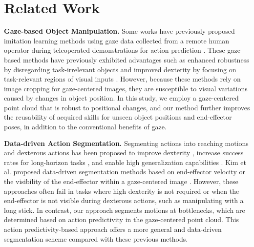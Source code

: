 \section{Related Work}
\textbf{Gaze-based Object Manipulation.} 
Some works have previously proposed imitation learning methods using gaze data collected from a remote human operator during teleoperated demonstrations for action prediction \cite{Kim2020, Kim2021, Kim2024}. These gaze-based methods have previously exhibited advantages such as enhanced robustness by disregarding task-irrelevant objects \cite{Kim2020} and improved dexterity by focusing on task-relevant regions of visual inputs \cite{Kim2021, Kim2024}. 
However, because these methods rely on image cropping for gaze-centered images, they are susceptible to visual variations caused by changes in object position.
In this study, we employ a gaze-centered point cloud that is robust to positional changes, and our method further improves the reusability of acquired skills for unseen object positions and end-effector poses, in addition to the conventional benefits of gaze.

\textbf{Data-driven Action Segmentation.} 
Segmenting actions into reaching motions and dexterous actions has been proposed to improve dexterity \cite{Kim2021}, increase success rates for long-horizon tasks \cite{Kim2024, Belkhale2023, Sundaresan2024}, and enable high generalization capabilities \cite{Johns2021, Sundaresan2024}. 
Kim et al. proposed data-driven segmentation methods based on end-effector velocity \cite{Kim2021} or the visibility of the end-effector within a gaze-centered image \cite{Kim2024}. However, these approaches often fail in tasks where high dexterity is not required or when the end-effector is not visible during dexterous actions, such as manipulating with a long stick.
In contrast, our approach segments motions at bottlenecks, which are determined based on action predictivity in the gaze-centered point cloud. 
This action predictivity-based approach offers a more general and data-driven segmentation scheme compared with these previous methods.

